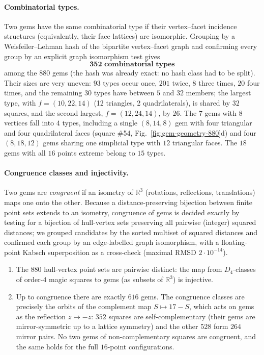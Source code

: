 \paragraph{Combinatorial types.}
Two gems have the same combinatorial type if their vertex--facet incidence
structures (equivalently, their face lattices) are isomorphic.  Grouping by a
Weisfeiler--Lehman hash of the bipartite vertex--facet graph and confirming
every group by an explicit graph isomorphism test gives
\[
\textbf{352 combinatorial types}
\]
among the $880$ gems (the hash was already exact: no hash class had to be
split).  Their sizes are very uneven: $93$ types occur once, $201$ twice,
$8$ three times, $20$ four times, and the remaining $30$ types have between
$5$ and $32$ members; the largest type, with $f=(10,22,14)$ (12 triangles,
2 quadrilaterals), is shared by $32$ squares, and the second largest,
$f=(12,24,14)$, by $26$.  The $7$ gems with $8$ vertices fall into $4$ types,
including a single $(8,14,8)$ gem with four triangular and four quadrilateral
faces (square \#54, Fig.~\ref{fig:gem-geometry-880}d) and four
$(8,18,12)$ gems sharing one simplicial type with $12$ triangular faces.  The $18$ gems with all $16$ points
extreme belong to $15$ types.

\paragraph{Congruence classes and injectivity.}
Two gems are \emph{congruent} if an isometry of $\mathbb R^3$ (rotations,
reflections, translations) maps one onto the other.  Because a
distance-preserving bijection between finite point sets extends to an
isometry, congruence of gems is decided exactly by testing for a bijection of
hull-vertex sets preserving all pairwise (integer) squared distances; we
grouped candidates by the sorted multiset of squared distances and confirmed
each group by an edge-labelled graph isomorphism, with a floating-point
Kabsch superposition as a cross-check (maximal RMSD $2\cdot10^{-14}$).

\begin{proposition}
\label{prop:gem-injective}
\begin{enumerate}
\item The $880$ hull-vertex point sets are pairwise distinct: the map from
  $D_4$-classes of order-$4$ magic squares to gems (as subsets of
  $\mathbb R^3$) is injective.
\item Up to congruence there are exactly $616$ gems.  The congruence classes
  are precisely the orbits of the complement map $S\mapsto 17-S$, which acts
  on gems as the reflection $z\mapsto -z$: $352$ squares are
  self-complementary (their gems are mirror-symmetric up to a lattice
  symmetry) and the other $528$ form $264$ mirror pairs.  No two gems of
  non-complementary squares are congruent, and the same holds for the full
  $16$-point configurations.
\end{enumerate}
\end{proposition}

